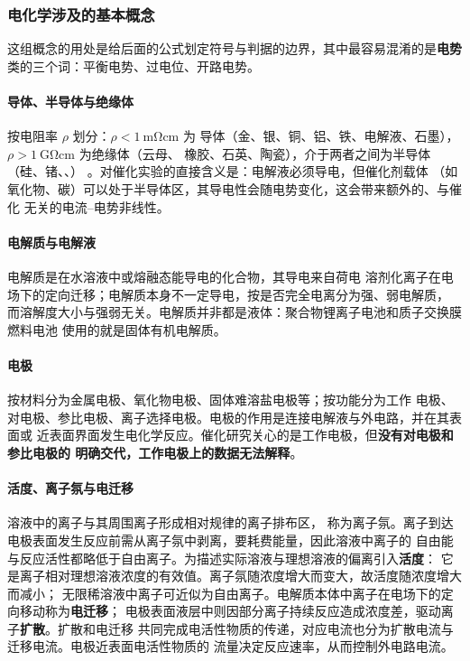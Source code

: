 \subsubsection{电化学涉及的基本概念}

这组概念的用处是给后面的公式划定符号与判据的边界，其中最容易混淆的是\textbf{电势}
类的三个词：平衡电势、过电位、开路电势。

\paragraph{导体、半导体与绝缘体} 按电阻率 $\rho$ 划分：$\rho<\qty{1}{\milli\ohm\centi\meter}$ 为
导体（金、银、铜、铝、铁、电解液、石墨），$\rho>\qty{1}{\giga\ohm\centi\meter}$ 为绝缘体（云母、
橡胶、石英、陶瓷），介于两者之间为半导体（硅、锗、、）
。对催化实验的直接含义是：电解液必须导电，但催化剂载体
（如氧化物、碳）可以处于半导体区，其导电性会随电势变化，这会带来额外的、与催化
无关的电流--电势非线性。

\paragraph{电解质与电解液} 电解质是在水溶液中或熔融态能导电的化合物，其导电来自荷电
溶剂化离子在电场下的定向迁移；电解质本身不一定导电，按是否完全电离分为强、弱电解质，
而溶解度大小与强弱无关。电解质并非都是液体：聚合物锂离子电池和质子交换膜燃料电池
使用的就是固体有机电解质。

\paragraph{电极} 按材料分为金属电极、氧化物电极、固体难溶盐电极等；按功能分为工作
电极、对电极、参比电极、离子选择电极。电极的作用是连接电解液与外电路，并在其表面或
近表面界面发生电化学反应。催化研究关心的是工作电极，但\textbf{没有对电极和参比电极的
明确交代，工作电极上的数据无法解释}。

\paragraph{活度、离子氛与电迁移} 溶液中的离子与其周围离子形成相对规律的离子排布区，
称为离子氛。离子到达电极表面发生反应前需从离子氛中剥离，要耗费能量，因此溶液中离子的
自由能与反应活性都略低于自由离子。为描述实际溶液与理想溶液的偏离引入\textbf{活度}：
它是离子相对理想溶液浓度的有效值。离子氛随浓度增大而变大，故活度随浓度增大而减小；
无限稀溶液中离子可近似为自由离子。电解质本体中离子在电场下的定向移动称为\textbf{电迁移}；
电极表面液层中则因部分离子持续反应造成浓度差，驱动离子\textbf{扩散}。扩散和电迁移
共同完成电活性物质的传递，对应电流也分为扩散电流与迁移电流。电极近表面电活性物质的
流量决定反应速率，从而控制外电路电流。

